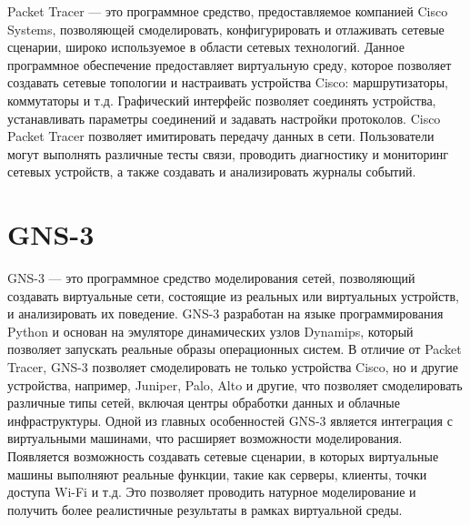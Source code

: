 Packet Tracer — это программное средство, предоставляемое компанией
Cisco Systems, позволяющей смоделировать, конфигурировать и отлаживать
сетевые сценарии, широко используемое в области сетевых
технологий. Данное программное обеспечение предоставляет виртуальную
среду, которое позволяет создавать сетевые топологии и настраивать
устройства Cisco: маршрутизаторы, коммутаторы и т.д. Графический
интерфейс позволяет соединять устройства, устанавливать параметры
соединений и задавать настройки протоколов. Cisco Packet Tracer
позволяет имитировать передачу данных в сети. Пользователи могут
выполнять различные тесты связи, проводить диагностику и мониторинг
сетевых устройств, а также создавать и анализировать журналы событий.

\section{GNS-3}

GNS-3 — это программное средство моделирования сетей, позволяющий
создавать виртуальные сети, состоящие из реальных или виртуальных
устройств, и анализировать их поведение. GNS-3 разработан на языке
программирования Python и основан на эмуляторе динамических узлов
Dynamips, который позволяет запускать реальные образы операционных
систем. В отличие от Packet Tracer, GNS-3 позволяет смоделировать не
только устройства Cisco, но и другие устройства, например, Juniper,
Palo, Alto и другие, что позволяет смоделировать различные типы сетей,
включая центры обработки данных и облачные инфраструктуры. Одной из
главных особенностей GNS-3 является интеграция с виртуальными
машинами, что расширяет возможности моделирования. Появляется
возможность создавать сетевые сценарии, в которых виртуальные машины
выполняют реальные функции, такие как серверы, клиенты, точки доступа
Wi-Fi и т.д. Это позволяет проводить натурное моделирование и
получить более реалистичные результаты в рамках виртуальной среды.





